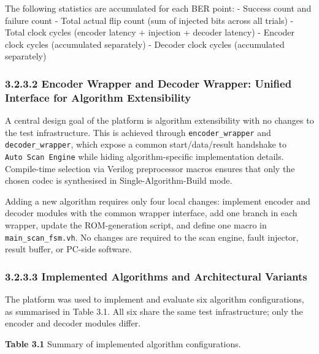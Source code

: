 \documentclass[
  12pt,
  a4paper]{report}
\begin{document}
The following statistics are accumulated for each BER point: - Success
count and failure count - Total actual flip count (sum of injected bits
across all trials) - Total clock cycles (encoder latency + injection +
decoder latency) - Encoder clock cycles (accumulated separately) -
Decoder clock cycles (accumulated separately)

\subsubsection{3.2.3.2 Encoder Wrapper and Decoder Wrapper: Unified
Interface for Algorithm
Extensibility}\label{encoder-wrapper-and-decoder-wrapper-unified-interface-for-algorithm-extensibility}

A central design goal of the platform is algorithm extensibility with no
changes to the test infrastructure. This is achieved through
\texttt{encoder\_wrapper} and \texttt{decoder\_wrapper}, which expose a
common start/data/result handshake to \texttt{Auto\ Scan\ Engine} while
hiding algorithm-specific implementation details. Compile-time selection
via Verilog preprocessor macros ensures that only the chosen codec is
synthesised in Single-Algorithm-Build mode.

Adding a new algorithm requires only four local changes: implement
encoder and decoder modules with the common wrapper interface, add one
branch in each wrapper, update the ROM-generation script, and define one
macro in \texttt{main\_scan\_fsm.vh}. No changes are required to the
scan engine, fault injector, result buffer, or PC-side software.

\subsubsection{3.2.3.3 Implemented Algorithms and Architectural
Variants}\label{implemented-algorithms-and-architectural-variants}

The platform was used to implement and evaluate six algorithm
configurations, as summarised in Table 3.1. All six share the same test
infrastructure; only the encoder and decoder modules differ.

\textbf{Table 3.1} Summary of implemented algorithm configurations.
\end{document}
